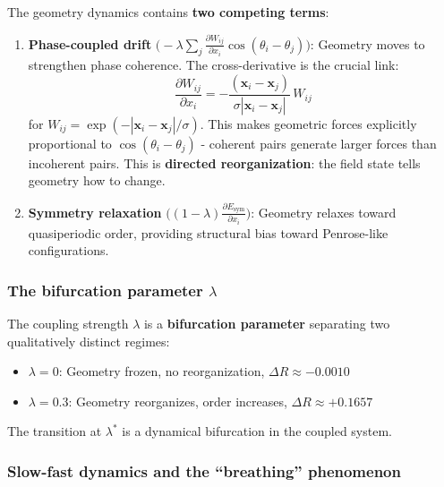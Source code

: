 \documentclass[12pt,a4paper]{article}
\theoremstyle{plain}
\theoremstyle{definition}
\begin{document}
The geometry dynamics contains \textbf{two competing terms}:
\begin{enumerate}
  \item \textbf{Phase-coupled drift}
    $\bigl(-\lambda \sum_j \frac{\partial W_{ij}}{\partial x_i}
    \cos(\theta_i - \theta_j)\bigr)$:
    Geometry moves to strengthen phase coherence.
    The cross-derivative is the crucial link:
    \begin{equation}
    \label{eq:cross_deriv}
    \frac{\partial W_{ij}}{\partial x_i}
      = -\frac{(\mathbf{x}_i - \mathbf{x}_j)}
               {\sigma |\mathbf{x}_i - \mathbf{x}_j|}\, W_{ij}
    \end{equation}
    for $W_{ij} = \exp(-|\mathbf{x}_i - \mathbf{x}_j|/\sigma)$.
    This makes geometric forces explicitly proportional to
    $\cos(\theta_i - \theta_j)$ - coherent pairs generate larger forces
    than incoherent pairs. This is \textbf{directed reorganization}: the
    field state tells geometry how to change.

  \item \textbf{Symmetry relaxation}
    $\bigl((1-\lambda) \frac{\partial E_{\text{sym}}}{\partial x_i}\bigr)$:
    Geometry relaxes toward quasiperiodic order, providing structural bias
    toward Penrose-like configurations.
\end{enumerate}

\subsubsection{The bifurcation parameter $\lambda$}

The coupling strength $\lambda$ is a \textbf{bifurcation parameter}
separating two qualitatively distinct regimes:
\begin{itemize}
  \item $\lambda = 0$: Geometry frozen, no reorganization,
        $\Delta R \approx -0.0010$
  \item $\lambda = 0.3$: Geometry reorganizes, order increases,
        $\Delta R \approx +0.1657$
\end{itemize}
The transition at $\lambda^*$ is a dynamical bifurcation in the coupled
system.

\subsubsection{Slow-fast dynamics and the ``breathing'' phenomenon}
\end{document}
